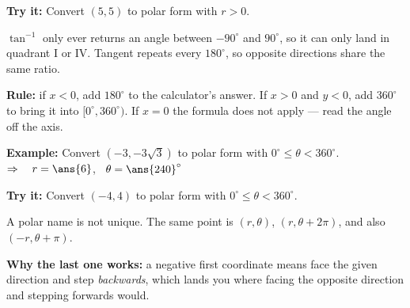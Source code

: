 \documentclass[12pt]{article}
\begin{document}
\begin{tryitbox}
\textbf{Try it:} \quad Convert $(5, 5)$ to polar form with $r > 0$.\\[2pt]
\end{tryitbox}


\begin{formulabox}
$\tan^{-1}$ only ever returns an angle between $-90^\circ$ and $90^\circ$, so it can only land in quadrant I or IV. Tangent repeats every $180^\circ$, so opposite directions share the same ratio.\par
\textbf{Rule:} if $x < 0$, add $180^\circ$ to the calculator's answer. If $x > 0$ and $y < 0$, add $360^\circ$ to bring it into $[0^\circ, 360^\circ)$. If $x = 0$ the formula does not apply --- read the angle off the axis.
\end{formulabox}

\begin{examplebox}
\textbf{Example:} \quad Convert $(-3, -3\sqrt{3})$ to polar form with $0^\circ \le \theta < 360^\circ$.
$\Rightarrow\quad r = \ans{6}$, \ $\theta = \ans{240}^\circ$
\end{examplebox}

\begin{tryitbox}
\textbf{Try it:} \quad Convert $(-4, 4)$ to polar form with $0^\circ \le \theta < 360^\circ$.\\[2pt]
\end{tryitbox}


\begin{formulabox}
A polar name is not unique. The same point is $(r, \theta)$, $(r, \theta + 2\pi)$, and also $(-r, \theta + \pi)$.\par
\textbf{Why the last one works:} a negative first coordinate means face the given direction and step \emph{backwards}, which lands you where facing the opposite direction and stepping forwards would.
\end{formulabox}
\end{document}
